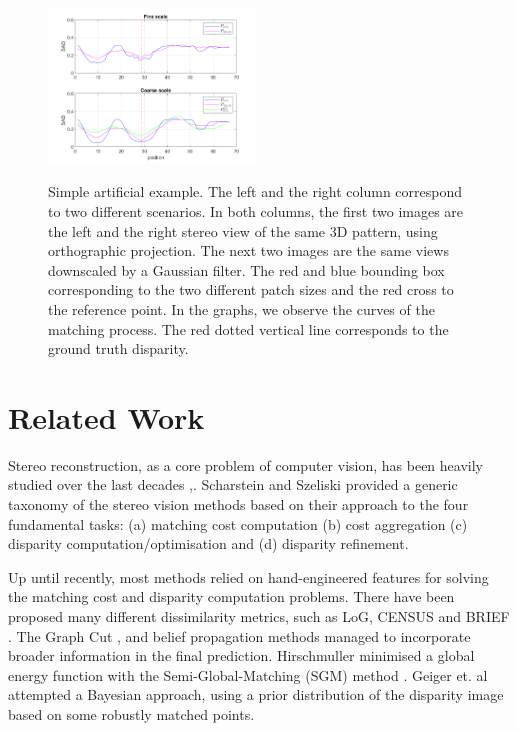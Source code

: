 \documentclass[runningheads]{llncs}
\begin{document}
\begin{figure}[!t]
\begin{center}
        \includegraphics[width=0.49\textwidth]{paper/latex/figures/low_resolution_success_graph.png}\\
        
    \end{center}
    
    \caption{Simple artificial example. The left and the right column correspond to two different scenarios. In both columns, the first two images are the left and the right stereo view of the same 3D pattern, using orthographic projection. The next two images are the same views downscaled by a Gaussian filter. The red and blue bounding box corresponding to the two different patch sizes and the red cross to the reference point. In the graphs, we observe the curves of the matching process. The red dotted vertical line corresponds to the ground truth disparity.}
    \label{fig:multiscale_importance_2D}
\end{figure}


\section{Related Work}

Stereo reconstruction, as a core problem of computer vision, has been heavily studied over the last decades \cite{Barnard1982ComputationalStereo},\cite{Brown2003}. Scharstein and Szeliski \cite{Scharstein2001AAlgorithms} provided a generic taxonomy of the stereo vision methods based on their approach to the four fundamental tasks: (a) matching cost computation (b) cost aggregation (c) disparity computation/optimisation and (d) disparity refinement.

Up until recently, most methods relied on hand-engineered features for solving the matching cost and disparity computation problems. There have been proposed many different dissimilarity metrics, such as LoG, CENSUS \cite{Zabih1996ACorrespondence} and BRIEF \cite{Calonder2010}. The Graph Cut \cite{Kolmogorov}, \cite{Boykov2001} and belief propagation \cite{Klaus2006} methods managed to incorporate broader information in the final prediction. Hirschmuller minimised a global energy function with the Semi-Global-Matching (SGM) method \cite{Hirschmuller2008StereoInformation}. Geiger et. al \cite{Geiger2011EfficientMatching} attempted a Bayesian approach, using a prior distribution of the disparity image based on some robustly matched points.
\end{document}
